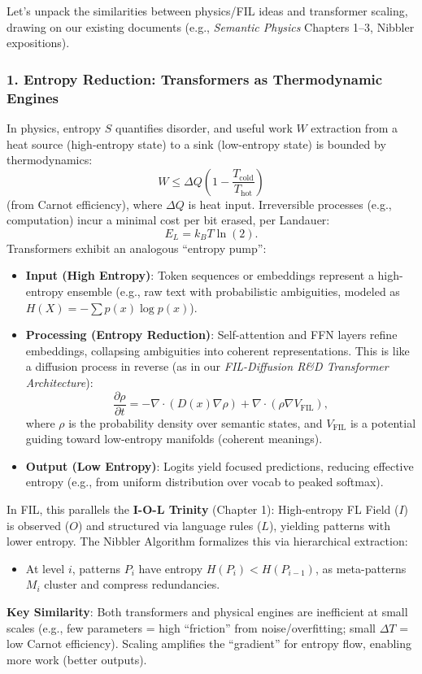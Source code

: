 \documentclass[11pt,letterpaper]{article}
\begin{document}
Let’s unpack the similarities between physics/FIL ideas and transformer scaling, drawing on our existing documents (e.g., \emph{Semantic Physics} Chapters 1–3, Nibbler expositions).

\subsubsection*{1. Entropy Reduction: Transformers as Thermodynamic Engines}
In physics, entropy $S$ quantifies disorder, and useful work $W$ extraction from a heat source (high-entropy state) to a sink (low-entropy state) is bounded by thermodynamics:
\[
W \leq \Delta Q \left(1 - \frac{T_{\text{cold}}}{T_{\text{hot}}}\right)
\]
(from Carnot efficiency), where $\Delta Q$ is heat input. Irreversible processes (e.g., computation) incur a minimal cost per bit erased, per Landauer:
\[
E_L = k_B T \ln(2).
\]
Transformers exhibit an analogous “entropy pump”:
\begin{itemize}
    \item \textbf{Input (High Entropy)}: Token sequences or embeddings represent a high-entropy ensemble (e.g., raw text with probabilistic ambiguities, modeled as $H(X) = -\sum p(x) \log p(x)$).
    \item \textbf{Processing (Entropy Reduction)}: Self-attention and FFN layers refine embeddings, collapsing ambiguities into coherent representations. This is like a diffusion process in reverse (as in our \emph{FIL-Diffusion R\&D Transformer Architecture}):
    \[
    \frac{\partial \rho}{\partial t} = -\nabla \cdot (D(x) \nabla \rho) + \nabla \cdot (\rho \nabla V_{\text{FIL}}),
    \]
    where $\rho$ is the probability density over semantic states, and $V_{\text{FIL}}$ is a potential guiding toward low-entropy manifolds (coherent meanings).
    \item \textbf{Output (Low Entropy)}: Logits yield focused predictions, reducing effective entropy (e.g., from uniform distribution over vocab to peaked softmax).
\end{itemize}
In FIL, this parallels the \textbf{I-O-L Trinity} (Chapter 1): High-entropy FL Field ($I$) is observed ($O$) and structured via language rules ($L$), yielding patterns with lower entropy. The Nibbler Algorithm formalizes this via hierarchical extraction:
\begin{itemize}
    \item At level $i$, patterns $P_i$ have entropy $H(P_i) < H(P_{i-1})$, as meta-patterns $M_i$ cluster and compress redundancies.
\end{itemize}
\textbf{Key Similarity}: Both transformers and physical engines are inefficient at small scales (e.g., few parameters = high “friction” from noise/overfitting; small $\Delta T$ = low Carnot efficiency). Scaling amplifies the “gradient” for entropy flow, enabling more work (better outputs).
\end{document}
